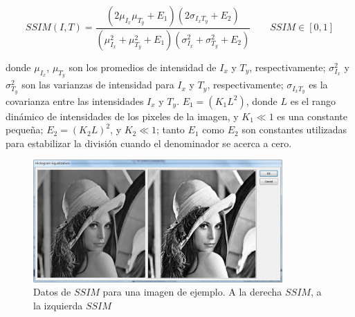 \begin{equation}
SSIM(I,T)\label{symbol:ssim} = \frac{(2\mu_{I_x} \mu_{T_y}+E_1)(2\sigma_{I_xT_y}+E_2)}{(\mu^2_{I_x}+\mu^2_{T_y}+E_1)(\sigma^2_{I_x} + \sigma^2_{T_y}+E_2)} \qquad SSIM \in [0,1]
\end{equation}

donde $\mu_{I_x}$, $\mu_{T_y}$ son los promedios de intensidad de $I_x$ y $T_y$, respectivamente; $\sigma^2_{I_x}$ y $\sigma^2_{T_y}$ son las varianzas de intensidad para $I_x$ y $T_y$, respectivamente; $\sigma_{I_xT_y}$ es la covarianza entre las intensidades $I_x$ y $T_y$. $E_1=(K_1L^2)$, donde $L$ es el rango dinámico de intensidades de los pixeles de la imagen, y $K_1 \ll 1$ es una constante pequeña; $E_2=(K_2L)^2$, y $K_2 \ll 1$; tanto $E_1$ como $E_2$ son constantes utilizadas para estabilizar la división cuando el denominador se acerca a cero.

\begin{figure}[H]
\centering
    \includegraphics[width=0.85\textwidth]{./Figures/lennaejemplo.jpg}
        \caption{Datos de $SSIM$ para una imagen de ejemplo. A la derecha $SSIM$, a la izquierda $SSIM$}
        \label{fig:lenaejemploSSIM}
\end{figure}





